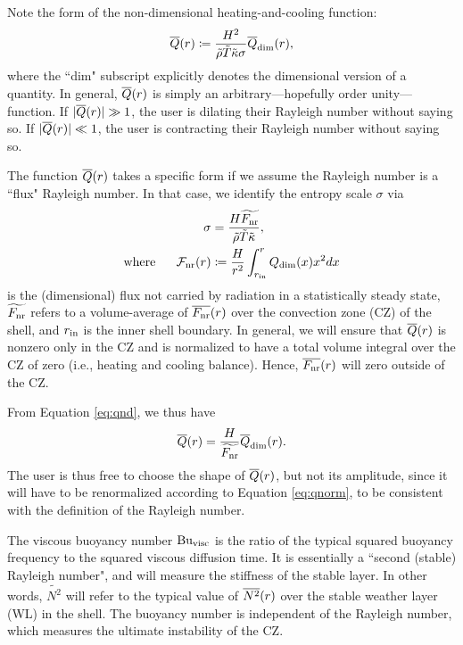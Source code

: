 \documentclass[12pt]{article}
\numberwithin{equation}{section}
\newcommand{\dimm}{_{\rm{dim}}}
\begin{document}
Note the form of the non-dimensional heating-and-cooling function:
\begin{align}\label{eq:qnd}
	\qref\ofr \define \frac{H^2}{\tilde{\rho}\tilde{T}\tilde{\kappa} \sigma} \qref\dimm\ofr,
\end{align}
where the ``dim" subscript explicitly denotes the dimensional version of a quantity. In general, $\overline{Q}(r)$ is simply an arbitrary---hopefully order unity---function. If $|\overline{Q}(r)|\gg1$, the user is dilating their Rayleigh number without saying so. If $|\overline{Q}(r)|\ll1$, the user is contracting their Rayleigh number without saying so. 
 
The function $\overline{Q}(r)$ takes a specific form if we assume the Rayleigh number is a ``flux" Rayleigh number. In that case, we identify the entropy scale $\sigma$ via
\begin{align}
	\sigma &= \frac{H \fluxnrtilde}{\tilde{\rho}\tilde{T}\tilde{\kappa}},\\
	\where \fluxscalar_{\rm{nr}}\ofr &\define \frac{H}{r^2}\int_{r\inn}^r Q\dimm(x) x^2 dx
\end{align}
is the (dimensional) flux not carried by radiation in a statistically steady state, $\widetilde{F_{\rm nr}}$ refers to a volume-average of $\overline{F_{\rm nr}}(r)$ over the convection zone (CZ) of the shell, and $r_{\rm{in}}$ is the inner shell boundary. In general, we will ensure that $\overline{Q}(r)$ is nonzero only in the CZ and is normalized to have a total volume integral over the CZ of zero (i.e., heating and cooling balance). Hence, $\overline{F_{\rm nr}}(r)$ will zero outside of the CZ. 

From Equation \eqref{eq:qnd}, we thus have
\begin{align}\label{eq:qnorm}
	\qref(r) = \frac{H}{\fluxnrtilde}\qref\dimm(r).
\end{align}
The user is thus free to choose the shape of $\overline{Q}(r)$, but not its amplitude, since it will have to be renormalized according to Equation \eqref{eq:qnorm}, to be consistent with the definition of the Rayleigh number.

The viscous buoyancy number ${\rm{Bu_{visc}}}$ is the ratio of the typical squared buoyancy frequency to the squared viscous diffusion time. It is essentially a ``second (stable) Rayleigh number", and will measure the stiffness of the stable layer. In other words, $\widetilde{N^2}$ will refer to the typical value of $\overline{N^2}(r)$ over the stable weather layer (WL) in the shell.  The buoyancy number is independent of the Rayleigh number, which measures the ultimate instability of the CZ. 
\end{document}
